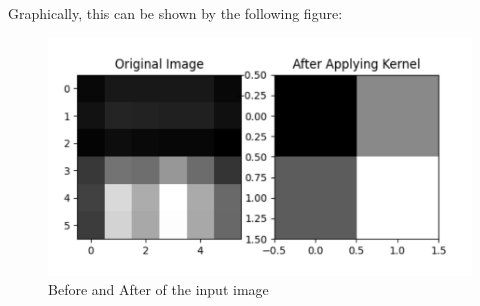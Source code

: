 \begin{itemize}
	Graphically, this can be shown by the following figure:
		\begin{figure}[h]
		\centering
		\includegraphics[width=.7\textwidth]{../Problem 11/kernel_F3.pdf}
		\caption{Before and After of the input image}
		\label{fig:kernel3}
	\end{figure}
	\vspace{3mm}
		
\end{itemize}
\vspace{5mm}






